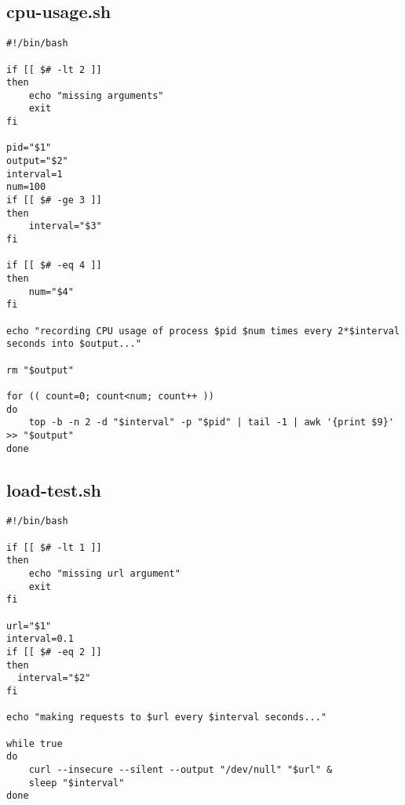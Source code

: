 \documentclass{article}
\begin{document}
\subsection{cpu-usage.sh}
\begin{verbatim}
#!/bin/bash

if [[ $# -lt 2 ]]
then
    echo "missing arguments"
    exit
fi

pid="$1"
output="$2"
interval=1
num=100
if [[ $# -ge 3 ]]
then
    interval="$3"
fi

if [[ $# -eq 4 ]]
then
    num="$4"
fi

echo "recording CPU usage of process $pid $num times every 2*$interval seconds into $output..."

rm "$output"

for (( count=0; count<num; count++ ))
do
    top -b -n 2 -d "$interval" -p "$pid" | tail -1 | awk '{print $9}' >> "$output"
done
\end{verbatim}

\subsection{load-test.sh}
\begin{verbatim}
#!/bin/bash

if [[ $# -lt 1 ]]
then
    echo "missing url argument"
    exit
fi

url="$1"
interval=0.1
if [[ $# -eq 2 ]]
then
  interval="$2"
fi

echo "making requests to $url every $interval seconds..."

while true
do
    curl --insecure --silent --output "/dev/null" "$url" &
    sleep "$interval"
done
\end{verbatim}
\end{document}
